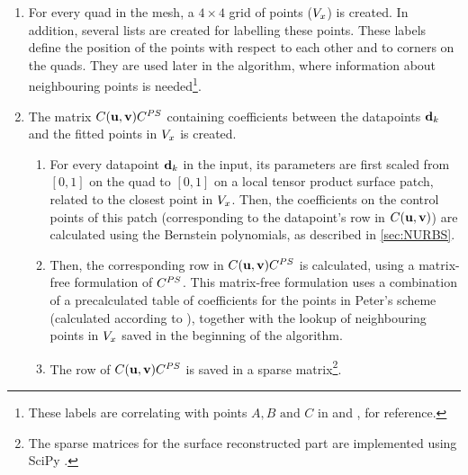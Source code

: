 \begin{enumerate}
\item For every quad in the mesh, a $4 \times 4$ grid of points ($\petersPatchPoints$) is created. In addition, several lists are created for labelling these points. These labels define the position of the points with respect to each other and to corners on the quads. They are used later in the algorithm, where information about neighbouring points is needed\footnote{These labels are correlating with points $A, B \text{ and } C$ in \cite{peters1992constructing} and \cite{eck1996automatic}, for reference.}.
\item The matrix $\lsControlPointCoefMatrix(\vec{u},\vec{v})\lsControlPointCoefMatrix^{PS}$ containing coefficients between the datapoints $\lsDataPoint_k$ and the fitted points in $\petersPatchPoints$ is created.
\begin{enumerate}[label=(\alph*)]
\item For every datapoint $\lsDataPoint_k$ in the input, its parameters are first scaled from $\left[0,1\right]$ on the quad to $\left[0,1\right]$ on a local tensor product \Bez surface patch, related to the closest point in $\petersPatchPoints$. Then, the coefficients on the \Bez control points of this patch (corresponding to the datapoint's row in $\lsControlPointCoefMatrix(\vec{u},\vec{v})$) are calculated using the Bernstein polynomials, as described in \autoref{sec:NURBS}. 
\item Then, the corresponding row in $\lsControlPointCoefMatrix(\vec{u},\vec{v})\lsControlPointCoefMatrix^{PS}$ is calculated, using a matrix-free formulation of $\lsControlPointCoefMatrix^{PS}$. This matrix-free formulation uses a combination of a precalculated table of coefficients for the points in Peter's scheme (calculated according to \cite{eck1996automatic}), together with the lookup of neighbouring points in $\petersPatchPoints$ saved in the beginning of the algorithm. 
\item The row of $\lsControlPointCoefMatrix(\vec{u},\vec{v})\lsControlPointCoefMatrix^{PS}$ is saved in a sparse matrix\footnote{The sparse matrices for the surface reconstructed part are implemented using SciPy \cite{SciPy}.}. 
\end{enumerate}
\end{enumerate}

